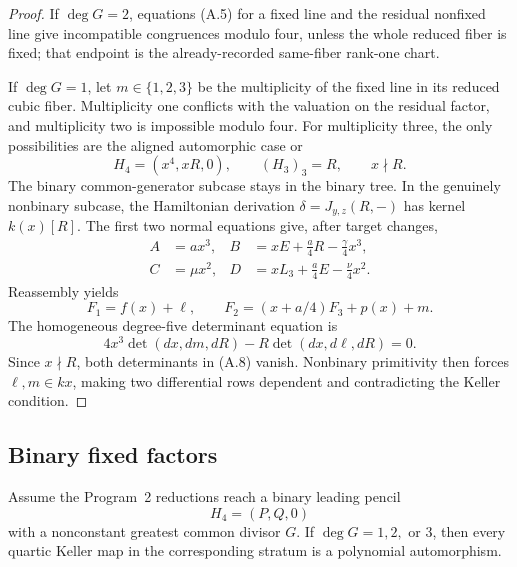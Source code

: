 \begin{proof}
If \(\deg G=2\), equations (A.5) for a fixed line and the residual
nonfixed line give incompatible congruences modulo four, unless the whole
reduced fiber is fixed; that endpoint is the already-recorded same-fiber
rank-one chart.

If \(\deg G=1\), let \(m\in\{1,2,3\}\) be the multiplicity of the fixed
line in its reduced cubic fiber.  Multiplicity one conflicts with the
valuation on the residual factor, and multiplicity two is impossible
modulo four.  For multiplicity three, the only possibilities are the
aligned automorphic case or
\[
 H_4=(x^4,xR,0),\qquad (H_3)_3=R,\qquad x\nmid R.   \tag{A.6}
\]
The binary common-generator subcase stays in the binary tree.  In the
genuinely nonbinary subcase, the Hamiltonian derivation
\(\delta=J_{y,z}(R,-)\) has kernel \(k(x)[R]\).  The first two normal
equations give, after target changes,
\[
\begin{aligned}
 A&=ax^3,&
 B&=xE+\frac a4R-\frac\gamma4x^3,\\
 C&=\mu x^2,&
 D&=xL_3+\frac a4E-\frac\nu4x^2.
\end{aligned}                                      \tag{A.7}
\]
Reassembly yields
\[
 F_1=f(x)+\ell,\qquad
 F_2=(x+a/4)F_3+p(x)+m.
\]
The homogeneous degree-five determinant equation is
\[
 4x^3\det(dx,dm,dR)-R\det(dx,d\ell,dR)=0.          \tag{A.8}
\]
Since \(x\nmid R\), both determinants in (A.8) vanish.  Nonbinary
primitivity then forces \(\ell,m\in kx\), making two differential rows
dependent and contradicting the Keller condition.
\end{proof}

\subsection{Binary fixed factors}

\begin{theorem}
\label{thm:quartic-binary-fixed-factors}
Assume the Program~2 reductions reach a binary leading pencil
\[
 H_4=(P,Q,0)
\]
with a nonconstant greatest common divisor \(G\).  If
\(\deg G=1,2,\) or \(3\), then every quartic Keller map in the corresponding
stratum is a polynomial automorphism.
\end{theorem}

